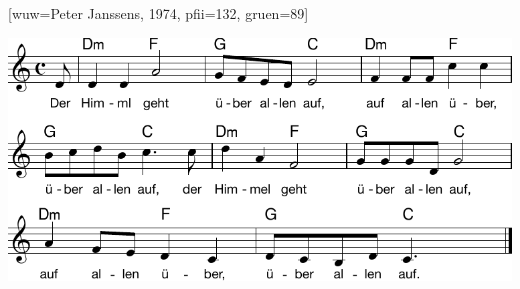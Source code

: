 [wuw={Peter Janssens, 1974}, pfii={132}, gruen={89}]

\beginverse
\endverse

\centering\includegraphics[width=1\textwidth]{Noten/Lied107a.pdf}

\endsong

\beginscripture

\endscripture

\begin{intersong}

\end{intersong}